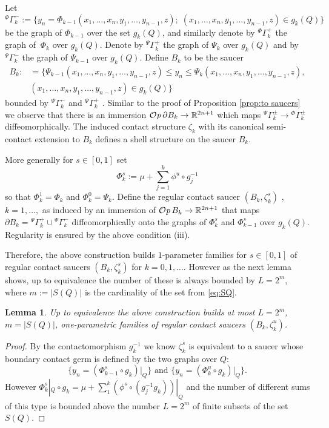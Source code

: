 \documentclass[12pt]{paper}
\theoremstyle{plain}
\newtheorem{lemma}[theorem]{Lemma}
\theoremstyle{definition}
\newcommand{\p}{\partial}
\newcommand{\abs}[1]{\left| #1 \right|}
\newcommand{\R}{{\mathbb{R}}}
\def\Op{{\mathcal O}{\it p}\,}
\numberwithin{figure}{section}
\begin{document}
Let 
$${}^{\Phi}\Gamma^-_k :=\{y_n=  \Phi_{k-1}(x_1,\ldots,x_n,y_1,\ldots, y_{n-1},z);\; (x_1,\ldots,x_n,y_1,\ldots, y_{n-1},z) \in g_k(Q)\}$$ be
 the graph of $ \Phi_{k-1}$ over the set $g_k(Q)$, 
and  similarly denote by ${}^\Phi\Gamma^+_k$ the graph of $\ \Phi_k$ over $g_k(Q)$. Denote by ${}^\Psi\Gamma^+_k$ the graph of $ \Psi_k$ over $g_k(Q)$ and by ${}^\Psi\Gamma^-_k$ the graph of $ \Psi_{k-1}$
over $g_k(Q)$. Define $B_k$ to be the saucer
\begin{align*}
B_k: &= 
 \{ \Psi_{k-1}(x_1,\ldots,x_n,y_1,\ldots, y_{n-1},z)\leq y_n\leq  \Psi_{k}(x_1,\ldots,x_n,y_1,\ldots, y_{n-1},z),\\
 & (x_1,\ldots,x_n,y_1,\ldots, y_{n-1},z) \in g_k(Q)\}
 \end{align*}
 bounded by ${}^\Psi\Gamma_k^-$ and ${}^\Psi\Gamma_k^+$ .
Similar to the proof of Proposition \ref{prop:to saucers} we observe that there is an immersion $\Op\p B_k\to\R^{2n+1}$ which maps ${}^\Psi\Gamma_k^\pm\to {}^\Phi\Gamma_k^\pm$ diffeomorphically. The induced contact structure $\zeta_k$ with its canonical  semi-contact extension to $B_k$ defines a shell structure on the saucer $B_k$.
 
More generally for $s \in [0,1]$ set 
$$\Phi^{s}_k:=\mu+ \sum_{j=1}^k\phi^u\circ g_j^{-1} $$ so that
$\Phi^1_k=\Phi_k$ and $\Phi^0_k=\Psi_k$.
Define the regular contact saucer  $(B_k, \zeta_k^s)$ , $k=1,\dots,$ as induced by an immersion of $\Op B_k\to \R^{2n+1}$ that
 maps $\p B_k = {}^\Psi\Gamma_k^+ \cup {}^\Psi\Gamma_k^-$ 
 diffeomorphically onto the graphs of  $ \Phi^{s}_k$ and $ \Phi^{s}_{k-1}$  over $ g_k(Q)$.
 Regularity is ensured by the above condition (iii).
 
 Therefore, the above construction builds
$1$-parameter families for $s \in [0,1]$ of regular contact saucers $(B_k, \zeta_k^s)$ for $k=0,1, \dots  $.
However  as the next lemma shows, up to equivalence the number of these is always bounded by $ L=2^m$, where $m:=\abs{S(Q)}$ is the cardinality of the set 
  from \eqref{eq:SQ}.

\begin{lemma}\label{lm:finite-contact}
 Up to equivalence the above construction builds at most $L=2^m$, $m= \abs{S(Q)}$,
 one-parametric families of regular contact saucers
 $(B_k,\zeta^{u}_k)$. %
\end{lemma}
\begin{proof}
By the contactomorphism $g_k^{-1}$ we know $\zeta^{s}_k$ is equivalent to a saucer  whose boundary contact germ is  defined by the two graphs over $Q$: 
$$
\mbox{$\{y_n = (\Phi^{s}_{k-1} \circ g_k)|_Q\}$ and $\{y_n = (\Phi^{u}_{k} \circ g_k)|_Q\}$.}
$$
However $\Phi^{s}_k|_Q \circ g_k = \mu+\sum\limits_1^k(\phi^s\circ (g_j^{-1}g_k))|_Q$ and
the number of different sums of this type is bounded above the number $L=2^{m }$ of finite subsets of the set $S(Q)$.
 
 \end{proof}
\end{document}
